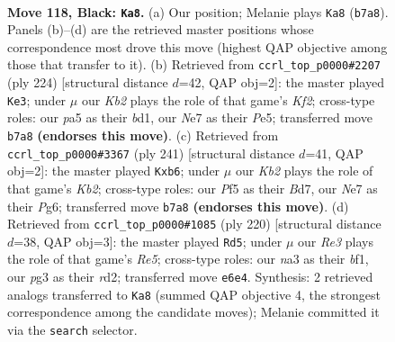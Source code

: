 \documentclass[11pt]{article}
\begin{document}
\clearpage

\begin{figure}[p]\centering
\begin{subfigure}{0.46\textwidth}\centering
\resizebox{\linewidth}{!}{%
\newchessgame
\chessboard[
  setfen={8/1k2n2K/p3r3/P4p1p/5B2/N5Pb/8/R7 b - - 47 118},
  showmover=false,
  pgfstyle=straightmove, color=movearrow, markmove={b7-a8}
]}
\caption{}
\end{subfigure}\hfill
\begin{subfigure}{0.46\textwidth}\centering
\resizebox{\linewidth}{!}{%
\newchessgame
\chessboard[
  setfen={8/4B2p/4p3/4PpP1/p7/P1k3P1/5K2/3b4 w - - 1 113},
  showmover=false,
  pgfstyle=straightmove, color=movearrow, markmove={f2-e3}
]}
\caption{}
\end{subfigure}
\\[4pt]
\begin{subfigure}{0.46\textwidth}\centering
\resizebox{\linewidth}{!}{%
\newchessgame
\chessboard[
  setfen={8/1k1b4/1P4p1/3pB3/p1r5/P3KP2/8/4R3 b - - 0 121},
  showmover=false,
  pgfstyle=straightmove, color=movearrow, markmove={b7-b6}
]}
\caption{}
\end{subfigure}\hfill
\begin{subfigure}{0.46\textwidth}\centering
\resizebox{\linewidth}{!}{%
\newchessgame
\chessboard[
  setfen={8/6k1/pK4p1/P3R1P1/8/5B2/3r4/5b2 w - - 76 111},
  showmover=false,
  pgfstyle=straightmove, color=movearrow, markmove={e5-d5}
]}
\caption{}
\end{subfigure}
\caption{\textbf{Move 118, Black: \texttt{Ka8}.} (a) Our position; Melanie plays \texttt{Ka8} (\texttt{b7a8}). Panels (b)--(d) are the retrieved master positions whose correspondence most drove this move (highest QAP objective among those that transfer to it). (b) Retrieved from \texttt{ccrl\_top\_p0000\#2207} (ply 224) [structural distance $d$=42, QAP obj=2]: the master played \texttt{Ke3}; under $\mu$ our \emph{Kb2} plays the role of that game's \emph{Kf2}; cross-type roles: our \emph{p}a5 as their \emph{b}d1, our \emph{N}e7 as their \emph{P}e5; transferred move \texttt{b7a8} \textbf{(endorses this move)}. (c) Retrieved from \texttt{ccrl\_top\_p0000\#3367} (ply 241) [structural distance $d$=41, QAP obj=2]: the master played \texttt{Kxb6}; under $\mu$ our \emph{Kb2} plays the role of that game's \emph{Kb2}; cross-type roles: our \emph{P}f5 as their \emph{B}d7, our \emph{N}e7 as their \emph{P}g6; transferred move \texttt{b7a8} \textbf{(endorses this move)}. (d) Retrieved from \texttt{ccrl\_top\_p0000\#1085} (ply 220) [structural distance $d$=38, QAP obj=3]: the master played \texttt{Rd5}; under $\mu$ our \emph{Re3} plays the role of that game's \emph{Re5}; cross-type roles: our \emph{n}a3 as their \emph{b}f1, our \emph{p}g3 as their \emph{r}d2; transferred move \texttt{e6e4}. Synthesis: 2 retrieved analogs transferred to \texttt{Ka8} (summed QAP objective 4, the strongest correspondence among the candidate moves); Melanie committed it via the \texttt{search} selector.}
\label{fig:thought-m235}
\end{figure}
\end{document}
